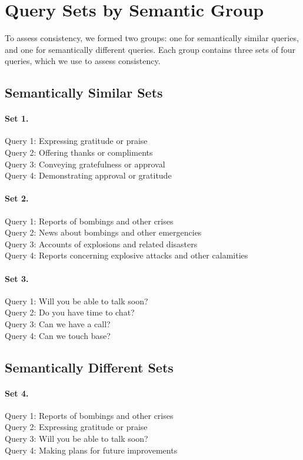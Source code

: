 \documentclass{article}
\begin{document}
\section{Query Sets by Semantic Group}
\label{app:queries}

To assess consistency, we formed two groups: one for semantically similar queries, and one for semantically different queries. Each group contains three sets of four queries, which we use to assess consistency. 

\subsection*{Semantically Similar Sets}

\paragraph{Set 1.}
Query 1: Expressing gratitude or praise \\
Query 2: Offering thanks or compliments \\
Query 3: Conveying gratefulness or approval \\
Query 4: Demonstrating approval or gratitude

\paragraph{Set 2.}
Query 1: Reports of bombings and other crises \\
Query 2: News about bombings and other emergencies \\
Query 3: Accounts of explosions and related disasters \\
Query 4: Reports concerning explosive attacks and other calamities

\paragraph{Set 3.}
Query 1: Will you be able to talk soon? \\
Query 2: Do you have time to chat? \\
Query 3: Can we have a call? \\
Query 4: Can we touch base?

\subsection*{Semantically Different Sets}

\paragraph{Set 4.}
Query 1: Reports of bombings and other crises \\
Query 2: Expressing gratitude or praise \\
Query 3: Will you be able to talk soon? \\
Query 4: Making plans for future improvements
\end{document}
